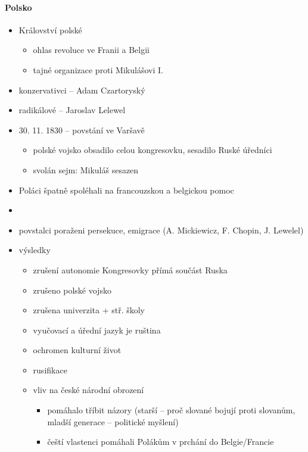 \paragraph{Polsko}
\begin{itemize}
\item Království polské
	\begin{itemize}
	\item ohlas revoluce ve Franii a Belgii
	\item tajné organizace proti Mikulášovi I.
	\end{itemize}
\item konzervativci -- Adam Czartoryský
\item radikálové -- Jaroslav Lelewel
\item 30. 11. 1830 -- povstání ve Varšavě
	\begin{itemize}
	\item polské vojsko obsadilo celou kongresovku, sesadilo Ruské úředníci
	\item svolán sejm: Mikuláš sesazen
	\end{itemize}
\item Poláci špatně spoléhali na francouzskou a belgickou pomoc
\item {}
\item povstalci poraženi \ra persekuce, emigrace (A. Mickiewicz, F. Chopin, J. Lewelel)
\item výsledky
	\begin{itemize}
	\item zrušení autonomie Kongresovky \ra přímá součást Ruska
	\item zrušeno polské vojsko
	\item zrušena univerzita + stř. školy
	\item vyučovací a úřední jazyk je ruština
	\item ochromen kulturní život
	\item rusifikace
	\item vliv na české národní obrození
		\begin{itemize}
		\item pomáhalo tříbit názory (starší -- proč slované bojují proti slovanům, mladší generace -- politické myšlení)
		\item čeští vlastenci pomáhali Polákům v prchání do Belgie/Francie
		\end{itemize}
	\end{itemize}
\end{itemize}

